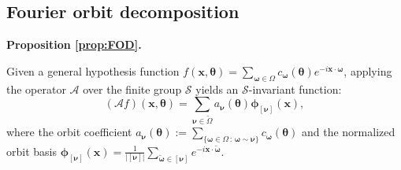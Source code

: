 \documentclass[%
 reprint,
 amsmath,amssymb,
 aps,
 pra,
]{revtex4-2}
\theoremstyle{definition}
\newenvironment{restate}[2]{%
  \par\noindent\textbf{#1 \ref{#2}. }\itshape%
}{\par\medskip}
\begin{document}
\subsection{Fourier orbit decomposition}
\label{app:FOD}

\begin{restate}{Proposition}{prop:FOD}
Given a general hypothesis function \(f(\bm{x}, \bm{\theta}) = \sum_{\bm{\omega} \in \Omega} c_{\bm{\omega}}(\bm{\theta}) e^{-i \bm{x} \cdot \bm{\omega}}\), applying the operator \(\mathcal{A}\) over the finite group \(\mathcal{S}\) yields an \(\mathcal{S}\)-invariant function:
\begin{equation}
(\mathcal{A}f)(\bm{x}, \bm{\theta}) = \sum_{\bm{\nu} \in \tilde{\Omega}} a_{\bm{\nu}}(\bm{\theta}) \bm{\phi}_{[\bm{\nu}]}(\bm{x}),
\end{equation}
where the orbit coefficient \(a_{\bm{\nu}}(\bm{\theta}) := \sum_{\{\bm{\omega} \in \Omega \,:\, \bm{\omega} \sim \bm{\nu}\}} c_{\bm{\omega}}(\bm{\theta})\) and the normalized orbit basis \(\bm{\phi}_{[\bm{\nu}]}(\bm{x})= \frac{1}{|[\bm{\nu}]|} \sum_{\tilde{\bm{\omega}} \in [\bm{\nu}]} e^{-i \bm{x} \cdot \tilde{\bm{\omega}}}\).
\end{restate}
\end{document}
